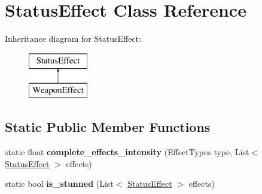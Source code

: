 \hypertarget{class_status_effect}{}\section{Status\+Effect Class Reference}
\label{class_status_effect}
Inheritance diagram for Status\+Effect\+:\begin{figure}[H]
\begin{center}
\leavevmode
\includegraphics[height=2.000000cm]{class_status_effect}
\end{center}
\end{figure}
\subsection*{Static Public Member Functions}
\begin{DoxyCompactItemize}
\item 
\mbox{\label{class_status_effect_a4dbc6146f97473e2efaafb25a78ebb5a}} 
static float {\bfseries complete\+\_\+effects\+\_\+intensity} (Effect\+Types type, List$<$ \hyperlink{class_status_effect}{Status\+Effect} $>$ effects)
\item 
\mbox{\label{class_status_effect_a7122b9aa5ee8469dcc92f8ad45a4fba9}} 
static bool {\bfseries is\+\_\+stunned} (List$<$ \hyperlink{class_status_effect}{Status\+Effect} $>$ effects)
\end{DoxyCompactItemize}
